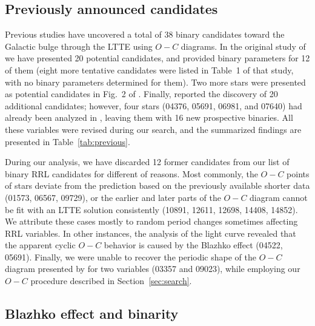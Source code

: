 \documentclass[twocolumn,times]{aastex63}
\begin{document}
\subsection{Previously announced candidates}\label{subsec:previous}

Previous studies have uncovered a total of 38 binary candidates toward the Galactic bulge through the
LTTE using $O-C$ diagrams.
In the original study of \citet{2015MNRAS.449L.113H} we have presented 20 potential candidates, and provided
binary parameters for 12 of them (eight more tentative candidates were listed in Table~1 of that study, with no
binary parameters determined for them).
Two more stars were presented as potential candidates in Fig.~2 of \citet{2018pas6.conf..248H}.
Finally, \citet{2019MNRAS.487L...1P} reported the discovery of 20 additional candidates; however, four stars
(04376, 05691, 06981, and 07640) had already been analyzed in \citet{2015MNRAS.449L.113H}, leaving them with
16 new prospective binaries.
All these variables were revised during our search, and the summarized findings are presented in Table~\ref{tab:previous}.

During our analysis, we have discarded 12 former candidates from our list of binary RRL candidates for different of reasons.
Most commonly, the $O-C$ points of stars deviate from the prediction based on the previously available shorter
data (01573, 06567, 09729), or the earlier and later parts of the $O-C$ diagram cannot be fit with
an LTTE solution consistently (10891, 12611, 12698, 14408, 14852). We attribute these cases mostly to random period changes
sometimes affecting RRL variables.
In other instances, the analysis of the light curve revealed that the apparent cyclic $O-C$ behavior is caused by the Blazhko effect
(04522, 05691).
Finally, we were unable to recover the periodic shape of the $O-C$ diagram presented by \citet{2019MNRAS.487L...1P} for two variables
(03357 and 09023), while employing our $O-C$ procedure described in Section~\ref{sec:search}.


\subsection{Blazhko effect and binarity}\label{subsec:blazhko}
\end{document}
